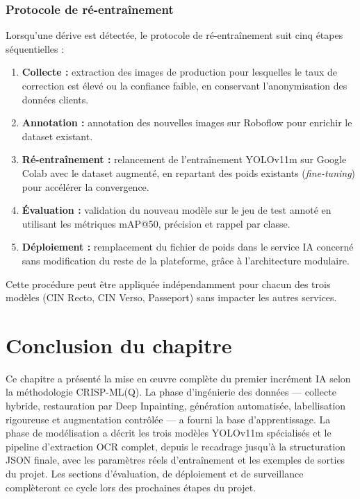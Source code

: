 \subsubsection{Protocole de ré-entraînement}

Lorsqu'une dérive est détectée, le protocole de ré-entraînement suit cinq étapes séquentielles :

\begin{enumerate}
  \item \textbf{Collecte :} extraction des images de production pour lesquelles le taux de correction est élevé ou la confiance faible, en conservant l'anonymisation des données clients.
  \item \textbf{Annotation :} annotation des nouvelles images sur Roboflow pour enrichir le dataset existant.
  \item \textbf{Ré-entraînement :} relancement de l'entraînement YOLOv11m sur Google Colab avec le dataset augmenté, en repartant des poids existants (\textit{fine-tuning}) pour accélérer la convergence.
  \item \textbf{Évaluation :} validation du nouveau modèle sur le jeu de test annoté en utilisant les métriques mAP@50, précision et rappel par classe.
  \item \textbf{Déploiement :} remplacement du fichier de poids dans le service IA concerné sans modification du reste de la plateforme, grâce à l'architecture modulaire.
\end{enumerate}

Cette procédure peut être appliquée indépendamment pour chacun des trois modèles (CIN Recto, CIN Verso, Passeport) sans impacter les autres services.


\section*{Conclusion du chapitre}

Ce chapitre a présenté la mise en œuvre complète du premier incrément IA selon la méthodologie CRISP-ML(Q). La phase d'ingénierie des données --- collecte hybride, restauration par Deep Inpainting, génération automatisée, labellisation rigoureuse et augmentation contrôlée --- a fourni la base d'apprentissage. La phase de modélisation a décrit les trois modèles YOLOv11m spécialisés et le pipeline d'extraction OCR complet, depuis le recadrage jusqu'à la structuration JSON finale, avec les paramètres réels d'entraînement et les exemples de sorties du projet. Les sections d'évaluation, de déploiement et de surveillance complèteront ce cycle lors des prochaines étapes du projet.

